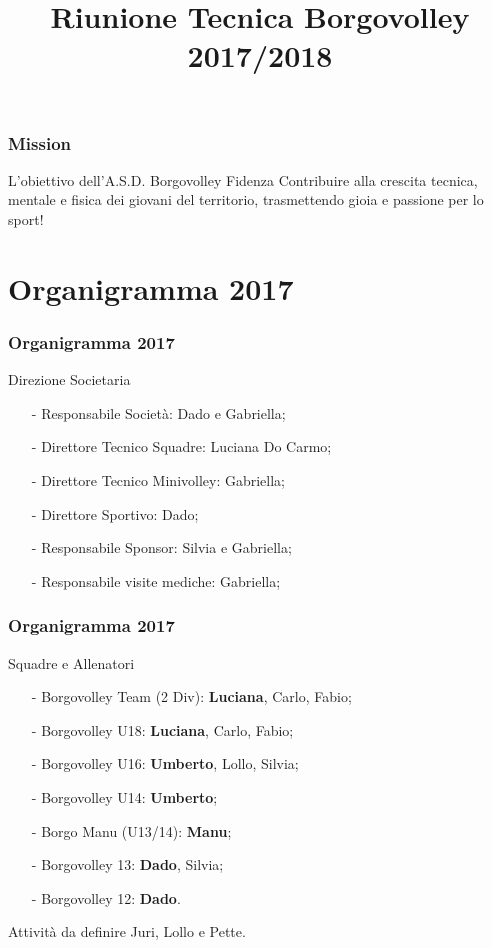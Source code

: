 \documentclass{beamer}
\title[Borgovolley 2017/2018]{Riunione Tecnica Borgovolley 2017/2018}
\date[24 Agosto 2017]{}
\begin{document}
\begin{frame}
\maketitle
\end{frame}

\begin{frame}
\frametitle{Mission}
\begin{block}{L'obiettivo dell'A.S.D. Borgovolley Fidenza}
Contribuire alla \alert{crescita} tecnica, mentale e fisica dei giovani del \alert{territorio}, trasmettendo \alert{gioia} e passione per lo sport!
\end{block}
\end{frame}

\section{Organigramma 2017}
\begin{frame}
\frametitle{Organigramma 2017}
\begin{block}{Direzione Societaria}
\begin{itemize}
\item[-]Responsabile Società: Dado e Gabriella;
\item[-]Direttore Tecnico Squadre: Luciana Do Carmo;
\item[-]Direttore Tecnico Minivolley: Gabriella;
\item[-]Direttore Sportivo: Dado;
\item[-]Responsabile Sponsor: Silvia e Gabriella;
\item[-]Responsabile visite mediche: Gabriella;
\end{itemize}
\end{block}
\end{frame}

\begin{frame}
\frametitle{Organigramma 2017}
\begin{block}{Squadre e Allenatori}
\begin{itemize}
\item[-]Borgovolley Team (2 Div): \textbf{Luciana}, Carlo, Fabio;
\item[-]Borgovolley U18: \textbf{Luciana}, Carlo, Fabio;
\item[-]Borgovolley U16: \textbf{Umberto}, Lollo, Silvia;
\item[-]Borgovolley U14: \textbf{Umberto};
\item[-]Borgo Manu (U13/14): \textbf{Manu};
\item[-]Borgovolley 13: \textbf{Dado}, Silvia;
\item[-]Borgovolley 12: \textbf{Dado}.
\end{itemize}
\end{block}

\begin{block}{Attività da definire}
Juri, Lollo e Pette.
\end{block}
\end{frame}
\end{document}
